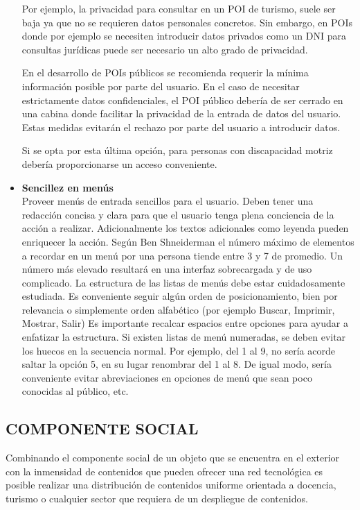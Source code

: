 \begin{itemize}
{Por ejemplo, la privacidad para consultar en un POI de turismo, suele ser baja
ya que no se requieren datos personales concretos. Sin embargo, en POIs donde
por ejemplo se necesiten introducir datos privados como un DNI para consultas
jurídicas puede ser necesario un alto grado de privacidad. 

En el desarrollo de POIs públicos se recomienda requerir la mínima información 
posible por parte del usuario. En el caso de necesitar estrictamente datos
confidenciales, el POI público debería de ser cerrado en una cabina donde
facilitar la privacidad de la entrada de datos del usuario. Estas medidas
evitarán el rechazo por parte del usuario a introducir datos.

Si se opta por esta última opción, para personas con discapacidad motriz
debería proporcionarse un acceso conveniente.
  } 
  \item{\textbf{Sencillez en menús}\\
Proveer menús de entrada sencillos para el usuario. Deben tener una redacción
concisa y clara para que el usuario tenga plena conciencia de la acción a
realizar. Adicionalmente los textos adicionales como leyenda pueden enriquecer
la acción. Según Ben Shneiderman el número máximo de elementos a
recordar en un menú por una persona tiende entre 3 y 7 de promedio\cite{Shn09}.
Un número más elevado resultará en una interfaz sobrecargada y de uso
complicado.
La estructura de las listas de menús debe estar cuidadosamente estudiada. Es
conveniente seguir algún orden de posicionamiento, bien por relevancia o
simplemente orden alfabético (por ejemplo Buscar, Imprimir, Mostrar, Salir)
Es importante recalcar espacios entre opciones para ayudar a enfatizar la
estructura.
Si existen listas de menú numeradas, se deben evitar los huecos en la secuencia
normal. Por ejemplo, del 1 al 9, no sería acorde saltar la opción 5, en su lugar
renombrar del 1 al 8.
De igual modo, sería conveniente evitar abreviaciones en opciones de menú que
sean poco conocidas al público, etc.
  } 
\end{itemize}

\subsection{\uppercase{Componente social}}

Combinando el componente social\cite{WaF94} de un objeto que se encuentra en el
exterior con la inmensidad de contenidos que pueden ofrecer una red
tecnológica es posible realizar una distribución de contenidos uniforme
orientada a docencia, turismo o cualquier sector que requiera de un
despliegue de contenidos.

